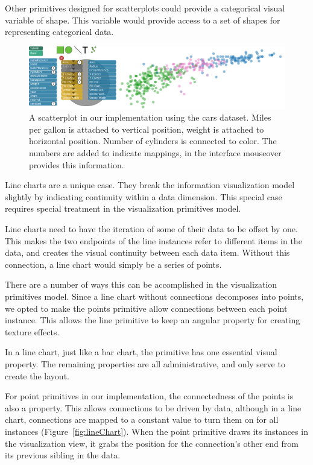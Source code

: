 Other primitives designed for scatterplots could provide a categorical visual variable of shape.
This variable would provide access to a set of shapes for representing categorical data.

\begin{figure}[t]
\centering
\includegraphics[width=\textwidth]{images/scatterplot.pdf}
\caption{A scatterplot in our implementation using the cars dataset.
Miles per gallon is attached to vertical position, weight is attached to horizontal position.
Number of cylinders is connected to color.
The numbers are added to indicate mappings, in the interface mouseover provides this information.
}
\label{fig:scatterplot}
\end{figure}

\label{lineChart}

Line charts are a unique case.
They break the information visualization model slightly by indicating continuity within a data dimension.
This special case requires special treatment in the visualization primitives model.

Line charts need to have the iteration of some of their data to be offset by one.
This makes the two endpoints of the line instances refer to different items in the data, and creates the visual continuity between each data item.
Without this connection, a line chart would simply be a series of points.

There are a number of ways this can be accomplished in the visualization primitives model.
Since a line chart without connections decomposes into points, we opted to make the points primitive allow connections between each point instance.
This allows the line primitive to keep an angular property for creating texture effects.

In a line chart, just like a bar chart, the primitive has one essential visual property.
The remaining properties are all administrative, and only serve to create the layout.

For point primitives in our implementation, the connectedness of the points is also a property.
This allows connections to be driven by data, although in a line chart, connections are mapped to a constant value to turn them on for all instances (Figure~\ref{fig:lineChart}).
When the point primitive draws its instances in the visualization view, it grabs the position for the connection's other end from its previous sibling in the data.

